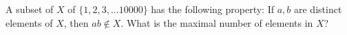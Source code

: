 A subset of $X$ of $\{1,2,3, \ldots 10000 \}$ has the following property: If $a,b$ are distinct elements of $X$,  then $ab\not\in X$. What is the maximal number of elements in $X$?